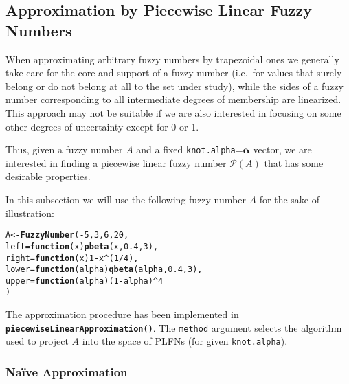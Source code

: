 \documentclass[11pt]{article}\usepackage[]{graphicx}\usepackage[]{color}
\makeatletter
\newcommand{\hlnum}[1]{\textcolor[rgb]{0.686,0.059,0.569}{#1}}%
\newcommand{\hlopt}[1]{\textcolor[rgb]{0,0,0}{#1}}%
\newcommand{\hlstd}[1]{\textcolor[rgb]{0.345,0.345,0.345}{#1}}%
\newcommand{\hlkwa}[1]{\textcolor[rgb]{0.161,0.373,0.58}{\textbf{#1}}}%
\newcommand{\hlkwb}[1]{\textcolor[rgb]{0.69,0.353,0.396}{#1}}%
\newcommand{\hlkwc}[1]{\textcolor[rgb]{0.333,0.667,0.333}{#1}}%
\newcommand{\hlkwd}[1]{\textcolor[rgb]{0.737,0.353,0.396}{\textbf{#1}}}%
\newenvironment{kframe}{%
 \def\at@end@of@kframe{}%
 \ifinner\ifhmode%
  \def\at@end@of@kframe{\end{minipage}}%
  \begin{minipage}{\columnwidth}%
 \fi\fi%
 \def\FrameCommand##1{\hskip\@totalleftmargin \hskip-\fboxsep
 \colorbox{shadecolor}{##1}\hskip-\fboxsep
     \hskip-\linewidth \hskip-\@totalleftmargin \hskip\columnwidth}%
 \MakeFramed {\advance\hsize-\width
   \@totalleftmargin\z@ \linewidth\hsize
   \@setminipage}}%
 {\par\unskip\endMakeFramed%
 \at@end@of@kframe}
\newenvironment{knitrout}{}{} %
\newcommand{\func}[1]{\texttt{\hlkwd{#1}}}
\newcommand{\argument}[1]{\texttt{\hlkwc{#1}}}
\makeatother
\begin{document}
\subsection{Approximation by Piecewise Linear Fuzzy Numbers}

When approximating arbitrary fuzzy numbers by trapezoidal ones we
generally take care for the core and support of a fuzzy number
(i.e.~for values that surely belong or do not belong at all to the
set under study), while the sides of a fuzzy number corresponding
to all intermediate degrees of membership are linearized. This
approach may not be suitable if we are also interested in focusing
on some other degrees of uncertainty except for 0 or 1.

Thus, given a fuzzy number $A$ and a fixed
\argument{knot.alpha}=$\boldsymbol\alpha$ vector, we are interested in
finding a piecewise linear fuzzy number $\mathcal{P}(A)$
that has some desirable properties.

In this subsection we will use the following fuzzy number $A$
for the sake of illustration:

\begin{knitrout}\small
{}\color{fgcolor}\begin{kframe}
\begin{alltt}
\hlstd{A} \hlkwb{<-} \hlkwd{FuzzyNumber}\hlstd{(}\hlopt{-}\hlnum{5}\hlstd{,} \hlnum{3}\hlstd{,} \hlnum{6}\hlstd{,} \hlnum{20}\hlstd{,}
   \hlkwc{left}\hlstd{=}\hlkwa{function}\hlstd{(}\hlkwc{x}\hlstd{)} \hlkwd{pbeta}\hlstd{(x,}\hlnum{0.4}\hlstd{,}\hlnum{3}\hlstd{),}
   \hlkwc{right}\hlstd{=}\hlkwa{function}\hlstd{(}\hlkwc{x}\hlstd{)} \hlnum{1}\hlopt{-}\hlstd{x}\hlopt{^}\hlstd{(}\hlnum{1}\hlopt{/}\hlnum{4}\hlstd{),}
   \hlkwc{lower}\hlstd{=}\hlkwa{function}\hlstd{(}\hlkwc{alpha}\hlstd{)} \hlkwd{qbeta}\hlstd{(alpha,}\hlnum{0.4}\hlstd{,}\hlnum{3}\hlstd{),}
   \hlkwc{upper}\hlstd{=}\hlkwa{function}\hlstd{(}\hlkwc{alpha}\hlstd{) (}\hlnum{1}\hlopt{-}\hlstd{alpha)}\hlopt{^}\hlnum{4}
\hlstd{)}
\end{alltt}
\end{kframe}
\end{knitrout}


The approximation procedure has been implemented
in \func{piecewiseLinearApproximation()}.
The \argument{method} argument selects the algorithm used
to project $A$ into the space of PLFNs (for given \argument{knot.alpha}).

\subsubsection{Na\"{i}ve Approximation}
\end{document}
